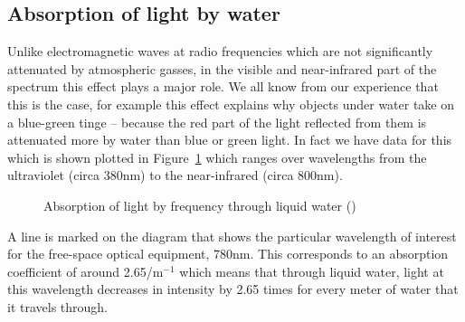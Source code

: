 \clearpage
\subsection{Absorption of light by water}
\label{sec:absorption}

Unlike electromagnetic waves at radio frequencies which are not
significantly attenuated by atmospheric gasses, in the visible and
near-infrared part of the spectrum this effect plays a major role. We
all know from our experience that this is the case, for example this
effect explains why objects under water take on a blue-green tinge --
because the red part of the light reflected from them is attenuated
more by water than blue or green light. In fact we have data for this
which is shown plotted in Figure~\ref{fig:absorption-liquid} which
ranges over wavelengths from the ultraviolet (circa 380nm) to the
near-infrared (circa 800nm).
\begin{figure}[h]
  \centering
  \caption{Absorption of light by frequency through liquid water
    (\cite{jonasz_absorption_2007})}
  \label{fig:absorption-liquid}
\end{figure}

A line is marked on the diagram that shows the particular wavelength
of interest for the free-space optical equipment, 780nm. This
corresponds to an absorption coefficient of around 2.65/m$^{-1}$ which
means that through liquid water, light at this wavelength decreases in
intensity by 2.65 times for every meter of water that it travels
through.

